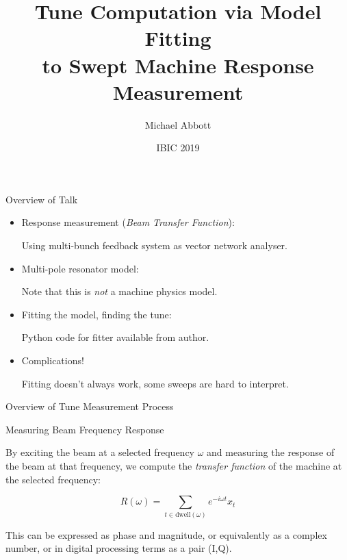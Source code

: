 \documentclass[aspectratio=169, xcolor=table]{beamer}
\title{%
    Tune Computation via Model Fitting\\to Swept Machine Response Measurement}
\author{Michael Abbott}
\date{IBIC 2019}
\institute{Diamond Light Source}
\begin{document}
%
\begin{frame}
\titlepage
\end{frame}



%
\begin{frame}{Overview of Talk}

\begin{itemize}
\item Response measurement (\emph{Beam Transfer Function}):

Using multi-bunch feedback system as vector network analyser.

\item Multi-pole resonator model:

Note that this is \emph{not} a machine physics model.
\item Fitting the model, finding the tune:

Python code for fitter available from author.
\item Complications!

Fitting doesn't always work, some sweeps are hard to interpret.
\end{itemize}

\end{frame}


%
\begin{frame}{Overview of Tune Measurement Process}

\end{frame}


%
\begin{frame}{Measuring Beam Frequency Response}

\begin{centering}

\end{centering}

\bigskip

By exciting the beam at a selected frequency $\omega$ and measuring the response
of the beam at that frequency, we compute the \emph{transfer function} of the
machine at the selected frequency:

\begin{equation*}
    R(\omega) = \sum_{t\in\text{dwell}(\omega)} e^{-i \omega t} x_t
\end{equation*}

This can be expressed as phase and magnitude, or equivalently as a
complex number, or in digital processing terms as a pair (I,Q).

\end{frame}
\end{document}
